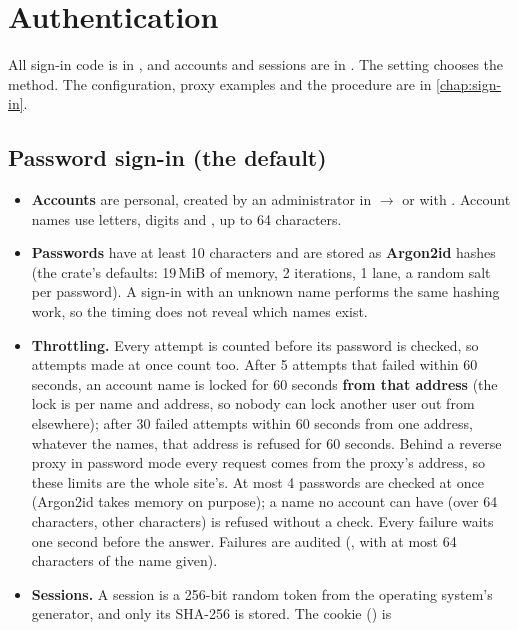 \section{Authentication}
\label{sec:security-auth}

All sign-in code is in , and accounts and sessions are in . The
setting  chooses the method. The configuration, proxy examples and the procedure
are in \cref{chap:sign-in}.

\subsection{Password sign-in (the default)}
\label{sec:security-password}

\begin{itemize}
\item \textbf{Accounts} are personal, created by an administrator in  $\rightarrow$
   or with . Account names use letters, digits and
  , up to 64 characters.
\item \textbf{Passwords} have at least 10 characters and are stored as \textbf{Argon2id} hashes
  (the  crate's defaults: 19\,MiB of memory, 2 iterations, 1 lane, a random salt
  per password). A sign-in with an unknown name performs the same hashing work, so the timing
  does not reveal which names exist.
\item \textbf{Throttling.} Every attempt is counted before its password is checked, so attempts
  made at once count too. After 5 attempts that failed within 60 seconds, an account name is
  locked for 60 seconds \textbf{from that address} (the lock is per name and address, so nobody
  can lock another user out from elsewhere); after 30 failed attempts within 60 seconds from one
  address, whatever the names, that address is refused for 60 seconds. Behind a reverse proxy in
  password mode every request comes from the proxy's address, so these limits are the whole
  site's. At most 4 passwords are checked at once (Argon2id takes memory on purpose); a name no
  account can have (over 64 characters, other characters) is refused without a check. Every
  failure waits one second before the answer. Failures are audited (, with
  at most 64 characters of the name given).
\item \textbf{Sessions.} A session is a 256-bit random token from the operating system's
  generator, and only its SHA-256 is stored. The cookie () is

\end{itemize}
